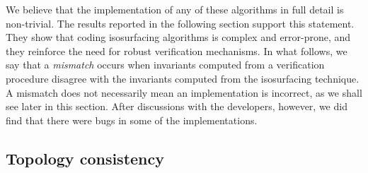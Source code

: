 We believe that the implementation of any of these algorithms in full
detail is non-trivial. The results reported in the following section
support this statement. They show that coding isosurfacing algorithms
is complex and error-prone, and they reinforce the need for robust
verification mechanisms.
In what follows, we say that a \emph{mismatch} occurs when invariants
computed from a verification procedure disagree with the invariants
computed from the isosurfacing technique.  A mismatch does not
necessarily mean an implementation is incorrect, as we shall see later
in this section.  After discussions with the developers, however, we
did find that there were bugs in some of the implementations.

\subsection{Topology consistency}
\label{sec:consistency}

